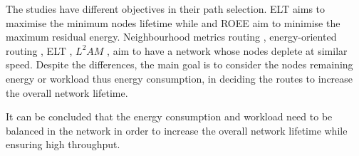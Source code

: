 The studies have different objectives in their path selection.
ELT \cite{elt} aims to maximise the minimum nodes lifetime while \cite{energyrpl} and ROEE \cite{roee} aim to minimise the maximum residual energy. Neighbourhood metrics routing \cite{spreadload}, energy-oriented routing \cite{loadbalance}, ELT \cite{elt}, $L^{2}AM$ \cite{compositeMetric}, \cite{customOF} aim to have a network whose nodes deplete at similar speed. 
Despite the differences, the main goal is to consider the nodes remaining energy or workload thus energy consumption, in deciding the routes to increase the overall network lifetime. 


It can be concluded that the energy consumption and workload need to be balanced in the network in order to increase the overall network lifetime while ensuring high throughput. 


